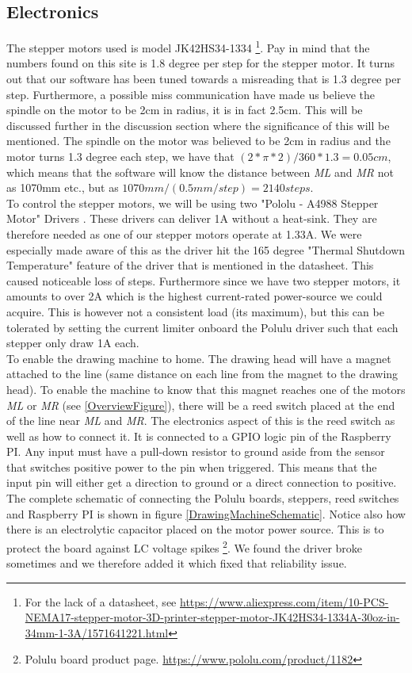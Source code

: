 \subsection{Electronics}
The stepper motors used is model JK42HS34-1334 \footnote{For the lack of a datasheet, see \url{https://www.aliexpress.com/item/10-PCS-NEMA17-stepper-motor-3D-printer-stepper-motor-JK42HS34-1334A-30oz-in-34mm-1-3A/1571641221.html}}. Pay in mind that the numbers found on this site is 1.8 degree per step for the stepper motor. It turns out that our software has been tuned towards a misreading that is 1.3 degree per step. Furthermore, a possible miss communication have made us believe the spindle on the motor to be 2cm in radius, it is in fact 2.5cm. This will be discussed further in the discussion section where the significance of this will be mentioned. The spindle on the motor was believed to be 2cm in radius and the motor turns 1.3 degree each step, we have that $ (2*\pi*2)/360*1.3 = 0.05cm $, which means that the software will know the distance between {\it ML} and {\it MR} not as 1070mm etc., but as $ 1070mm/(0.5mm/step) = 2140 steps $.\\
To control the stepper motors, we will be using two 
"Pololu - A4988 Stepper Motor" Drivers \citep{Pololu:StepperDriver}. These drivers can deliver 1A without a heat-sink. They are therefore needed as one of our stepper motors operate at 1.33A. We were especially made aware of this as the driver hit the 165 degree "Thermal Shutdown Temperature" feature of the driver that is mentioned in the datasheet. This caused noticeable loss of steps. Furthermore since we have two stepper motors, it amounts to over 2A which is the highest current-rated power-source we could acquire. This is however not a consistent load (its maximum), but this can be tolerated by setting the current limiter onboard the Polulu driver such that each stepper only draw 1A each.\\ 
To enable the drawing machine to home. The drawing head will have a magnet attached to the line (same distance on each line from the magnet to the drawing head). To enable the machine to know that this magnet reaches one of the motors {\it ML} or {\it MR} (see \ref{OverviewFigure}), there will be a reed switch placed at the end of the line near {\it ML} and {\it MR}. The electronics aspect of this is the reed switch as well as how to connect it. It is connected to a GPIO logic pin of the Raspberry PI. Any input must have a pull-down resistor to ground aside from the sensor that switches positive power to the pin when triggered. This means that the input pin will either get a direction to ground or a direct connection to positive.\\
The complete schematic of connecting the Polulu boards, steppers, reed switches and Raspberry PI is shown in figure \ref{DrawingMachineSchematic}. Notice also how there is an electrolytic capacitor placed on the motor power source. This is to protect the board against LC voltage spikes \footnote{Polulu board product page. \url{https://www.pololu.com/product/1182}}. We found the driver broke sometimes and we therefore added it which fixed that reliability issue.  \\

